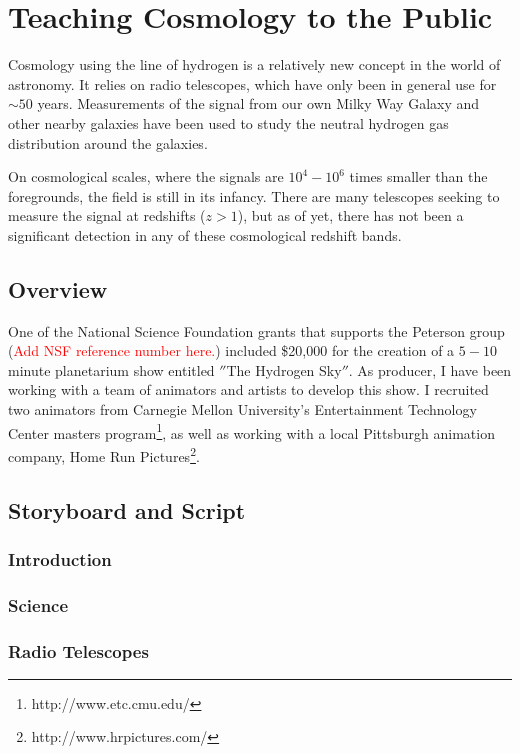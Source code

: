 \chapter{Teaching \cm Cosmology to the Public}\label{Ch:Planet}
Cosmology using the \cm line of hydrogen is a relatively new concept in the world of astronomy. It relies on radio telescopes, which have only been in general use for $\sim 50$ years. Measurements of the \cm signal from our own Milky Way Galaxy and other nearby galaxies have been used to study the neutral hydrogen gas distribution around the galaxies. 

On cosmological scales, where the \cm signals are $10^4 - 10^6$ times smaller than the foregrounds, the field is still in its infancy. There are many telescopes seeking to measure the \cm signal at redshifts ($z>1$), but as of yet, there has not been a significant detection in any of these cosmological redshift bands. 


\section{Overview}
One of the National Science Foundation grants that supports the Peterson group (\textcolor{red}{Add NSF reference number here.}) included \$20,000 for the creation of a $5-10$ minute planetarium show entitled $''$The Hydrogen Sky$''$. As producer, I have been working with a team of animators and artists to develop this show. I recruited two animators from Carnegie Mellon University's Entertainment Technology Center masters program\footnote{http://www.etc.cmu.edu/}, as well as working with a local Pittsburgh animation company, Home Run Pictures\footnote{http://www.hrpictures.com/}. 



\section{Storyboard and Script}

\subsection{Introduction}
\subsection{\cm Science}
\subsection{Radio Telescopes}
